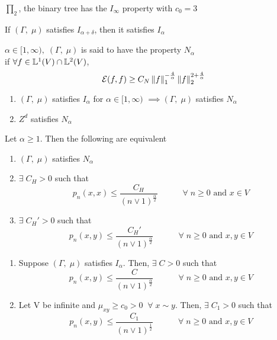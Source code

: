 \documentclass[main]{subfiles}
\begin{document}
\ex
$\prod_2$, the binary tree has the $I_\infty$ property with $c_0 = 3$
\begin{obs}
    If $(\Gamma,\;\mu)$ satisfies $I_{\alpha+\delta}$, then it satisfies $I_\alpha$
\end{obs}
\begin{definition}
    $\alpha \in [1, \infty),\;(\Gamma,\;\mu)$ is said to have the property $N_\alpha$\\
    if $\forall f \in \mathbb L^1(V) \cap \mathbb L^2(V)$,
    \[\mathcal E(f,f) \geq C_N\left\lVert f\right\rVert_{1}^{-\frac{4}{\alpha}}\left\lVert f\right\rVert_{2}^{2+\frac{4}{\alpha}}\]
\end{definition}
\newpage
\begin{remark}[]
    \begin{enumerate}
        \item $(\Gamma,\;\mu)$ satisfies $I_\alpha$ for $\alpha \in [1, \infty)$
              $\implies (\Gamma,\;\mu)$ satisfies $N_\alpha$
        \item $Z^d$ satisfies $N_\alpha$
    \end{enumerate}
\end{remark}
\begin{theorem}
    Let $\alpha \geq 1.$ Then the following are equivalent
    \begin{enumerate}
        \item $(\Gamma,\;\mu)$ satisfies $N_\alpha$
        \item $\exists\;C_H > 0$ such that
              \[p_n(x,x) \leq \frac{C_H}{(n\vee1)^\frac{\alpha}{2}} \hspace{3em} \forall\;n \geq 0\text{ and } x \in V\]
        \item $\exists\;C_H' > 0$ such that
              \[p_n(x,y) \leq \frac{C_H'}{(n\vee1)^\frac{\alpha}{2}} \hspace{3em} \forall\;n \geq 0\text{ and } x,y \in V\]
    \end{enumerate}
\end{theorem}
\begin{corollary}
    \label{cor:ubounds}
    \begin{enumerate}
        \item Suppose $(\Gamma,\;\mu)$ satisfies $I_\alpha.$ Then, $\exists\;C > 0$ such that
              \[p_n(x,y) \leq \frac{C}{(n\vee1)^\frac{\alpha}{2}} \hspace{3em} \forall\;n \geq 0\text{ and } x,y \in V\]
        \item Let V be infinite and $\mu_{xy} \geq c_0 > 0\;\;\forall\;x \sim y.$ Then, $\exists\;C_1 > 0$ such that
              \[p_n(x,y) \leq \frac{C_1}{(n\vee1)^\frac{1}{2}} \hspace{3em} \forall\;n \geq 0\text{ and } x,y \in V\]
    \end{enumerate}
\end{corollary}
\end{document}
